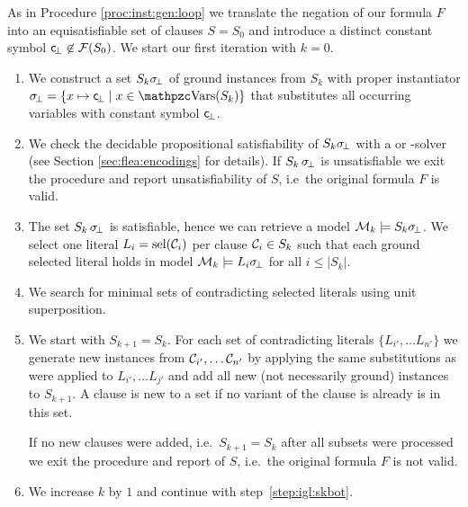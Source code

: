 \begin{procedure}\label{proc:inst:gen:eq:loop} \cite{KS2010ijcar}
	As in Procedure \vref{proc:inst:gen:loop} we translate the 
	negation of our formula \( F \) 
	into an equisatisfiable set of clauses
	\( S = S_0 \) and introduce a distinct constant symbol
	\( \mathsf{c} \!_\bot\not\in\mathcal{F}(S_0) \).
	We start our first iteration with \( k=0 \).

	\begin{enumerate}
		\item\label{step:igl:eq:skbot}
		We construct a set \( S_{k}\sigma \!_\bot \) of ground instances from \( S_k \)
		with proper instantiator \( \subsbot = \{ x\mapsto \consbot \mid x\in\var(S_k) \} \)
		that substitutes all occurring variables with constant symbol \( \mathsf{c} \!_\bot \).
%
		\item\label{step:igl:eq:sksat} 
		We check the decidable propositional satisfiability of
		\( S_k\sigma \!_\bot \) with a \SAT{} or \SMT{}-solver
		(see Section \vref{sec:flea:encodings} for details).
		If \( S_k \, \sigma \!_\bot \) is unsatisfiable
		we exit the procedure 
		and report
		{ unsatisfiability} of \( S \), i.e~the original formula \( F \) is valid.

		\item\label{step:igl:eq:model} The set \( S_k \, \sigma \!_\bot \) is satisfiable, hence we can retrieve a model \( \mathcal{M}_k \models S_k\sigma \!_\bot \).
		We select one literal \( L_i = \operatorname{sel}(\mathcal{C}_i) \) per clause \( \mathcal{C}_i \in S_k \)
		such that each ground selected literal holds in model
		\( \mathcal{M}_k\models L_i\sigma \!_\bot \) for all \( i \leq | S_k | \).

		\item\label{step:igl:eq:false} We search for minimal sets 
		of contradicting selected literals using unit superposition.

		\item We start with \( S_{k+1} = S_k \). For each set of contradicting literals
		\( \{ L_{i'}, \ldots L_{n'} \} \)
		we generate new instances from \( \mathcal{C}_{i'}, \ldots \mathcal{C}_{n'} \)
		by applying the same substitutions as were applied 
		to \( L_{i'}, \ldots L_{j'} \) 
		and add all new (not necessarily ground) instances to \( S_{k+1} \).
		A clause is new to a set if no variant of the clause is already is in this set.

		If no new clauses were added, i.e.~\( S_{k+1} = S_k \) after all subsets were processed we exit the procedure and report  of \( S \), i.e.~the original formula \( F \) is not valid.

		\item We increase \( k \) by \( 1 \) and continue with step~\ref{step:igl:skbot}.

	\end{enumerate}
\end{procedure}

